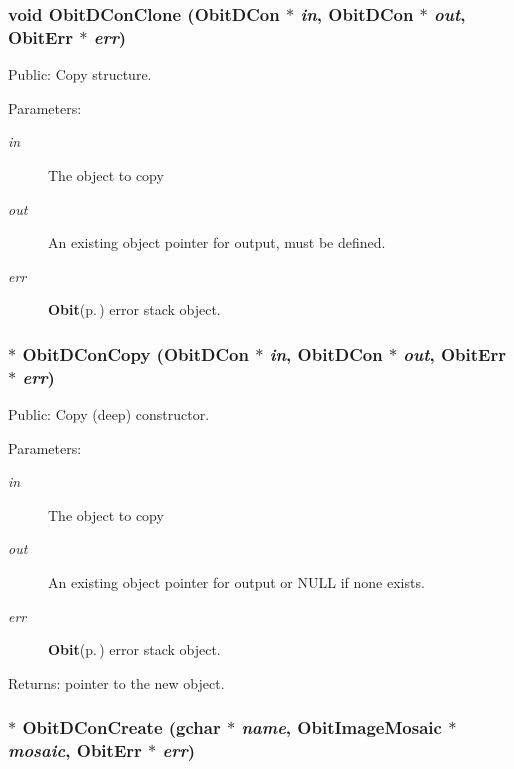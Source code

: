 \subsubsection{\setlength{\rightskip}{0pt plus 5cm}void Obit\-DCon\-Clone ({\bf Obit\-DCon} $\ast$ {\em in}, {\bf Obit\-DCon} $\ast$ {\em out}, {\bf Obit\-Err} $\ast$ {\em err})}\label{ObitDCon_8c_a9}


Public: Copy structure. 

\begin{Desc}
\item[Parameters:]
\begin{description}
\item[{\em in}]The object to copy \item[{\em out}]An existing object pointer for output, must be defined. \item[{\em err}]{\bf Obit}{\rm (p.\,\pageref{structObit})} error stack object. \end{description}
\end{Desc}
\subsubsection{$\ast$ Obit\-DCon\-Copy ({\bf Obit\-DCon} $\ast$ {\em in}, {\bf Obit\-DCon} $\ast$ {\em out}, {\bf Obit\-Err} $\ast$ {\em err})}\label{ObitDCon_8c_a8}


Public: Copy (deep) constructor. 

\begin{Desc}
\item[Parameters:]
\begin{description}
\item[{\em in}]The object to copy \item[{\em out}]An existing object pointer for output or NULL if none exists. \item[{\em err}]{\bf Obit}{\rm (p.\,\pageref{structObit})} error stack object. \end{description}
\end{Desc}
\begin{Desc}
\item[Returns:]pointer to the new object. \end{Desc}
\subsubsection{$\ast$ Obit\-DCon\-Create (gchar $\ast$ {\em name}, {\bf Obit\-Image\-Mosaic} $\ast$ {\em mosaic}, {\bf Obit\-Err} $\ast$ {\em err})}\label{ObitDCon_8c_a10}


